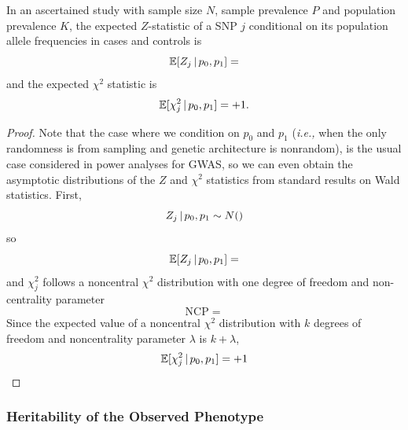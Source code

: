 \documentclass[11pt]{article}
\numberwithin{equation}{section}
\numberwithin{definition}{section}
\numberwithin{thm}{section}
\numberwithin{lemma}{section}
\numberwithin{prop}{section}
\numberwithin{cor}{section}
\numberwithin{hyp}{section}
\begin{document}
\begin{lemma}
In an ascertained study with sample size $N$, sample prevalence $P$ and population prevalence $K$, the expected $Z$-statistic of a SNP $j$
conditional on its population allele frequencies in cases and controls is
\begin{equation}
	\mathbb{E}[Z_j\,|\, p_0,p_1] =
\end{equation}
and the expected $\chi^2$ statistic is
\begin{equation}
	\mathbb{E}[\chi^2_j\,|\, p_0,p_1] = +1.
\end{equation}
\end{lemma}
\begin{proof}

Note that the case where we condition on $p_0$ and $p_1$ 
(\emph{i.e.,} when the only randomness is from sampling and genetic architecture is nonrandom),
is the usual case considered in power analyses for GWAS, so we can even obtain the asymptotic distributions of
the $Z$ and $\chi^2$ statistics from standard results on Wald statistics.
First,
\begin{equation*}
	Z_j\,|\, p_0, p_1 \sim N()
\end{equation*}
so
\begin{equation*}
	\mathbb{E}[Z_j\,|\, p_0,p_1] =
\end{equation*}
and $\chi^2_j$ follows a noncentral $\chi^2$ distribution with one degree of freedom and non-centrality parameter
\begin{equation*}
	\mathrm{NCP} =
\end{equation*}
Since the expected value of a noncentral $\chi^2$ distribution with $k$ degrees of freedom and noncentrality parameter $\lambda$ is 
$k+\lambda$,
\begin{equation*}
	\mathbb{E}[\chi^2_j\,|\, p_0, p_1] = +1
\end{equation*}
\end{proof}

\subsubsection{Heritability of the Observed Phenotype}\label{CCA:Heritability}
\end{document}
